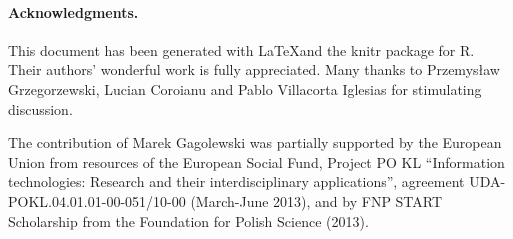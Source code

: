 \documentclass[11pt]{article}\usepackage[]{graphicx}\usepackage[]{color}
\newcommand{\package}[1]{\textsf{#1}\xspace}
\newcommand{\lang}[1]{\textsf{#1}\xspace}
\newcommand{\R}{\lang{R}}
\begin{document}



%

\paragraph{Acknowledgments.}
This document has been generated with \LaTeX and the \package{knitr}
package for \R.
Their authors' wonderful work is fully appreciated.
Many thanks to Przemys\l{}aw Grzegorzewski, Lucian Coroianu
and Pablo Villacorta Iglesias for stimulating discussion.



The contribution of Marek Gagolewski was partially supported
by the European Union from resources of the European Social Fund, Project PO KL
``Information technologies: Research and their interdisciplinary
applications'', agreement UDA-POKL.04.01.01-00-051/10-00 (March-June 2013),
and by FNP START Scholarship from the Foundation for Polish Science (2013).



% 
% 
\end{document}
